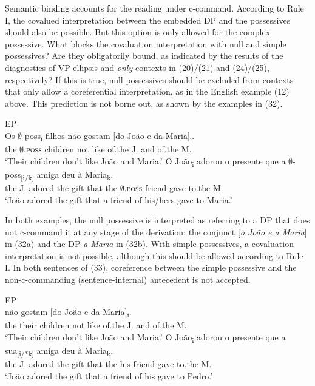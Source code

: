 \documentclass[output=paper]{langsci/langscibook}
\begin{document}
Semantic binding accounts for the reading under c-command. According to Rule I, the covalued interpretation between the embedded DP and the possessives should also be possible. But this option is only allowed for the complex possessive. What blocks the covaluation interpretation with null and simple possessives? Are they obligatorily bound, as indicated by the results of the diagnostics of VP ellipsis and \textit{only}{}-contexts in (20)/(21) and (24)/(25), respectively? If this is true, null possessives should be excluded from contexts that only allow a coreferential interpretation, as in the English example (12) above. This prediction is not borne out, as shown by the examples in (32).

\ea%
         EP\label{ex:wein:32}\\
    \ea  
    \gll Os $\emptyset$-poss\textsubscript{i} filhos não gostam [do João e da Maria]\textsubscript{i}.\\
         the $\emptyset$\textsc{.poss} children not like of.the J. and of.the M.\\
    \glt ‘Their children don’t like João and Maria.’
    \ex 
    \gll O João\textsubscript{i} adorou o presente que a $\emptyset$-poss\textsubscript{[i/k]} amiga deu à Maria\textsubscript{k}.\\
         the J. adored the gift that the $\emptyset$\textsc{.poss} friend gave to.the M.\\
    \glt ‘João adored the gift that a friend of his/hers gave to Maria.’
    \z
\z    

In both examples, the null possessive is interpreted as referring to a DP that does not c-command it at any stage of the derivation: the conjunct [\textit{o João e a Maria}] in (32a) and the DP \textit{a Maria} in (32b). With simple possessives, a covaluation interpretation is not possible, although this should be allowed according to Rule I. In both sentences of (33), coreference between the simple possessive and the non-c-commanding (sentence-internal) antecedent is not accepted.

\ea%
         EP\label{ex:wein:33}\\
    \ea  
    \gll {} não gostam [do João e da Maria]\textsubscript{i}.\\
         the their children not like of.the J. and of.the M.\\
    \glt ‘Their children don’t like João and Maria.’
    \ex  
    \gll O João\textsubscript{i} adorou o presente que a sua\textsubscript{[i/*k]} amiga deu à Maria\textsubscript{k}.\\
         the J. adored the gift that the his friend gave to.the M.\\
    \glt ‘João adored the gift that a friend of his gave to Pedro.’
    \z
\z
\end{document}
